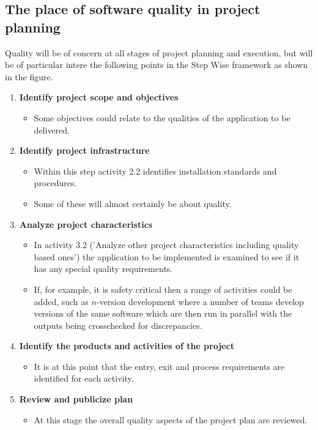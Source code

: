 \documentclass{article}
\begin{document}
	\subsection{The place of software quality in project planning}
	Quality will be of concern at all stages of project planning and execution, but will be of particular intere the following points in the Step Wise framework as shown in the figure.
	\begin{enumerate}[label=\textbf{Step \arabic* :},leftmargin=3.75em]
		\item \textbf{Identify project scope and objectives}
		\begin{itemize}[leftmargin=0em,label=]
			\item Some objectives could relate to the qualities of the application to be delivered.
		\end{itemize}
		\item \textbf{Identify project infrastructure}
		\begin{itemize}[leftmargin=0em]
			\item Within this step activity 2.2 identifies installation standards and procedures.
			\item Some of these will almost certainly be about quality.
		\end{itemize}
		\item \textbf{Analyze project characteristics}
		\begin{itemize}[leftmargin=0em]
			\item In activity 3.2 ('Analyze other project characteristics including quality based ones') the
				application to be implemented is examined to see if it has any special quality requirements.
			\item If, for example, it is safety critical then a range of activities could be added, such as
				$n$-version development where a number of teams develop versions of the same software which
				are then run in parallel with the outputs being crosschecked for discrepancies.
		\end{itemize}
		\item \textbf{Identify the products and activities of the project}
		\begin{itemize}[leftmargin=0em,label=]
			\item It is at this point that the entry, exit and process requirements are identified for each
				activity.
		\end{itemize} \setcounter{enumi}{7}
		\item \textbf{Review and publicize plan}
		\begin{itemize}[leftmargin=0em,label=]
			\item At this stage the overall quality aspects of the project plan are reviewed.
		\end{itemize}
	\end{enumerate}
\end{document}
